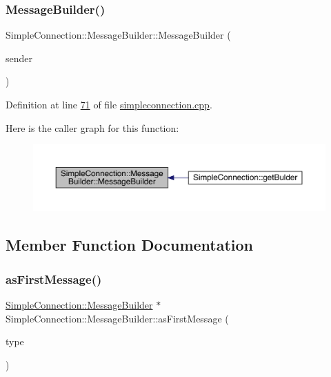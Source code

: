 \subsubsection{\texorpdfstring{Message\+Builder()}{MessageBuilder()}}
{\footnotesize\ttfamily Simple\+Connection\+::\+Message\+Builder\+::\+Message\+Builder (\begin{DoxyParamCaption}\item[{\hyperlink{a00125}{Simple\+Connection} $\ast$}]{sender }\end{DoxyParamCaption})\hspace{0.3cm}{\ttfamily [private]}}



Definition at line \hyperlink{a00005_source_l00071}{71} of file \hyperlink{a00005_source}{simpleconnection.\+cpp}.

Here is the caller graph for this function\+:
\nopagebreak
\begin{figure}[H]
\begin{center}
\leavevmode
\includegraphics[width=350pt]{d9/d47/a00129_a872f905bf802df170dc7d1e0e9e75105_icgraph}
\end{center}
\end{figure}


\subsection{Member Function Documentation}
\mbox{\label{a00129_ae54a2b522f87b6cbab31d9ee27f29264}} 
\subsubsection{\texorpdfstring{as\+First\+Message()}{asFirstMessage()}}
{\footnotesize\ttfamily \hyperlink{a00129}{Simple\+Connection\+::\+Message\+Builder} $\ast$ Simple\+Connection\+::\+Message\+Builder\+::as\+First\+Message (\begin{DoxyParamCaption}\item[{\hyperlink{a00008_ab66d8802c50493de7d50e181d6f8e296}{e\+Connection\+Type}}]{type }\end{DoxyParamCaption})}



